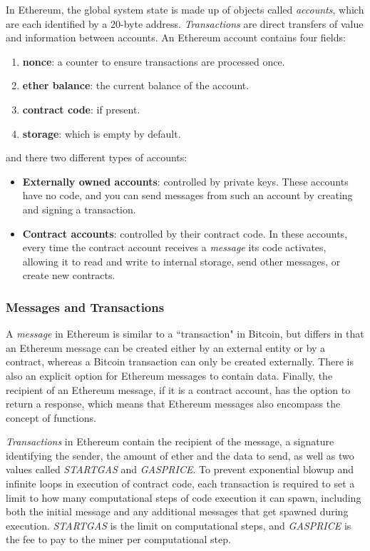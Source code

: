 \documentclass[10pt,a4paper]{article}
\begin{document}
In Ethereum, the global system state is made up of objects called \textit{accounts}, which are each identified by a 20-byte address. \textit{Transactions} are direct transfers of value and information between accounts. An Ethereum account contains four fields: 
\begin{enumerate}[1.]
    \item \textbf{nonce}: a counter to ensure transactions are processed once.
    \item \textbf{ether balance}: the current balance of the account.
    \item \textbf{contract code}: if present.
    \item \textbf{storage}: which is empty by default.
\end{enumerate}
and there two different types of accounts:
\begin{itemize}
    \item \textbf{Externally owned accounts}: controlled by private keys. These accounts have no code, and you can send messages from such an account by creating and signing a transaction.
    \item \textbf{Contract accounts}: controlled by their contract code. In these accounts, every time the contract account receives a \textit{message} its code activates, allowing it to read and write to internal storage, send other messages, or create new contracts.
\end{itemize}

\subsubsection{Messages and Transactions}

A \textit{message} in Ethereum is similar to a ``transaction" in Bitcoin, but differs in that an Ethereum message can be created either by an external entity or by a contract, whereas a Bitcoin transaction can only be created externally. There is also an explicit option for Ethereum messages to contain data. Finally, the recipient of an Ethereum message, if it is a contract account, has the option to return a response, which means that Ethereum messages also encompass the concept of functions.

\textit{Transactions} in Ethereum contain the recipient of the message, a signature identifying the sender, the amount of ether and the data to send, as well as two values called \textit{STARTGAS} and \textit{GASPRICE}. To prevent exponential blowup and infinite loops in execution of contract code, each transaction is required to set a limit to how many computational steps of code execution it can spawn, including both the initial message and any additional messages that get spawned during execution. \textit{STARTGAS} is the limit on computational steps, and \textit{GASPRICE} is the fee to pay to the miner per computational step. 
\end{document}
